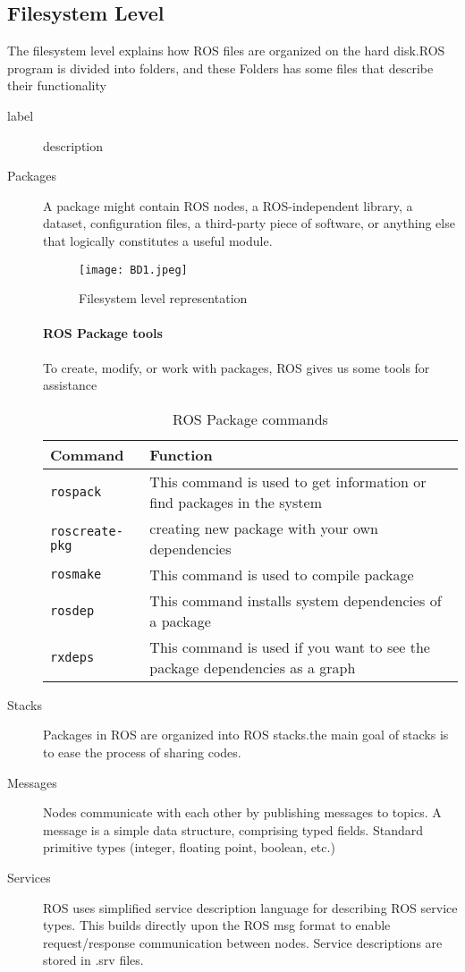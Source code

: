 	\subsection{Filesystem Level}
The filesystem level explains how ROS files are organized on the hard disk.ROS program is divided into folders, and these Folders has some files that describe their functionality


\begin{description}
    \item[label] description
\end{description}
 		 \begin{description}
  			\item [Packages]
  				A package might contain ROS nodes, a ROS-independent library, a dataset, configuration files, a third-party piece of software, or anything else that logically constitutes a useful module.
  	\begin{figure}[ht]
  		\centering
  		\caption{Filesystem level representation}
  		\texttt{[image: BD1.jpeg]}
  	\end{figure}
  			\paragraph{ROS Package tools }
  	To create, modify, or work with packages, ROS gives us some tools for assistance
  	\begin{table}[H]
  		\centering
  	\begin{tabular}{| p{3cm} |p{8cm}|}\hline
          Command  &  Function\\\hline\hline
          \texttt{rospack}  &  This command is used to get information or find packages in the system\\\hline
           \texttt{roscreate-pkg} & creating new package with your own dependencies \\\hline
           \texttt{rosmake} &  This command is used to compile package\\\hline
           \texttt{rosdep} &  This command installs system dependencies of a package\\\hline 
           \texttt{rxdeps} &  This command is used if you want to see the package dependencies as a graph\\\hline 
      \end{tabular}
  		\caption{ROS Package commands}
  		\label{table:1}
  	\end{table}
 \item [Stacks]
 Packages in ROS are organized into ROS stacks.the main goal of stacks is to ease the process of sharing codes.
 \item [Messages]
 Nodes communicate with each other by publishing messages to topics. A message is a simple data structure, comprising typed fields. Standard primitive types (integer, floating point, boolean, etc.)
 \item [Services]
 ROS uses simplified service description language for describing ROS service types. This builds directly upon the ROS msg format to enable request/response communication between nodes. Service descriptions are stored in .srv files. 
\end{description}

